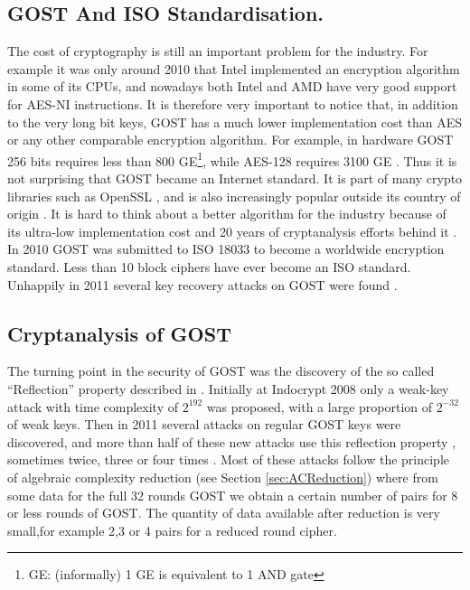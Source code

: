 \subsection{GOST And ISO Standardisation.}
The cost of cryptography is still an important problem for the industry.
For example it was only around 2010 that Intel implemented an encryption algorithm
in some of its CPUs, and nowadays both Intel and AMD have very good support for AES-NI instructions.
It is therefore very important to notice that,
in addition to the very long bit keys,
GOST has a much lower implementation cost
than AES or any other comparable encryption algorithm.
For example, in hardware GOST 256 bits requires less than 800 GE\footnote{GE: (informally) 1 GE is equivalent to 1 AND gate },
while AES-128 requires 3100 GE \cite{PoschmannImplement}.
Thus it is not surprising that GOST became an Internet standard.
It is part of many crypto libraries such as OpenSSL
\cite{GOSTRussianReferenceImplementation}, %
and is also increasingly popular %
outside its country of origin
\cite{PoschmannImplement}.
It is hard to think about a better algorithm for the industry
because of its ultra-low implementation cost and
20 years of cryptanalysis efforts behind it \cite{PoschmannImplement}.
In 2010 GOST was submitted to ISO 18033
to become a worldwide encryption standard.
Less than 10
block ciphers have ever become an
ISO %
standard.
Unhappily in 2011 several key recovery attacks on GOST were found
\cite{JapaneseGOSTMITMFSE2011,gostreport,gostac,gostdc0,gostdc2}.

\subsection{Cryptanalysis of GOST} \label{sec:CrytanalysisGOST}

The turning point in the security of GOST was the discovery of the so called
``Reflection'' property described in \cite{GOSTReflectionKara}.
Initially at Indocrypt 2008 only a weak-key attack with time complexity of $2^{192}$ was proposed, with a large proportion of $2^{-32}$ of weak keys. Then in 2011 several attacks on regular GOST keys were discovered, and more than half of these new attacks use this reflection property \cite{JapaneseGOSTMITMFSE2011,DunkelmanImprovedGOST8R}, sometimes twice, three or four times \cite{gostac}. Most of these attacks follow the principle of algebraic complexity reduction (see Section \ref{sec:ACReduction}) where from some data for the full 32 rounds GOST we obtain a certain number
of pairs for 8 or less rounds of GOST. The quantity of data available after reduction is very small,for example 2,3 or 4 pairs for a reduced round cipher. 

